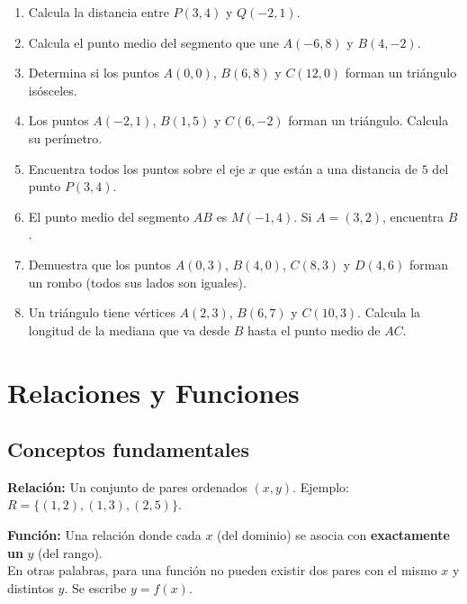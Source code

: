 \documentclass[12pt, letterpaper]{article}
\begin{document}
\begin{enumerate}[series=ejercicios, leftmargin=*]
  \item \facil{} Calcula la distancia entre $P(3, 4)$ y $Q(-2, 1)$.

  \item \facil{} Calcula el punto medio del segmento que une $A(-6, 8)$ y $B(4, -2)$.

  \item \facil{} Determina si los puntos $A(0, 0)$, $B(6, 8)$ y $C(12, 0)$ forman un triángulo isósceles.

  \item \medio{} Los puntos $A(-2, 1)$, $B(1, 5)$ y $C(6, -2)$ forman un triángulo. Calcula su perímetro.

  \item \medio{} Encuentra todos los puntos sobre el eje $x$ que están a una distancia de $5$ del punto $P(3, 4)$.

  \item \medio{} El punto medio del segmento $AB$ es $M(-1, 4)$. Si $A = (3, 2)$, encuentra $B$.

  \item \dificil{} Demuestra que los puntos $A(0, 3)$, $B(4, 0)$, $C(8, 3)$ y $D(4, 6)$ forman un rombo (todos sus lados son iguales).

  \item \dificil{} Un triángulo tiene vértices $A(2, 3)$, $B(6, 7)$ y $C(10, 3)$. Calcula la longitud de la mediana que va desde $B$ hasta el punto medio de $AC$.
\end{enumerate}


\section{Relaciones y Funciones}

\subsection{Conceptos fundamentales}

\begin{cuadroteoria}
  \textbf{Relación:} Un conjunto de pares ordenados $(x, y)$. Ejemplo: $R = \{(1, 2), (1, 3), (2, 5)\}$.

  \textbf{Función:} Una relación donde cada $x$ (del dominio) se asocia con \textbf{exactamente un} $y$ (del rango).\\[6pt]

  En otras palabras, para una función no pueden existir dos pares con el mismo $x$ y distintos $y$. Se escribe $y = f(x)$.
\end{cuadroteoria}
\end{document}
